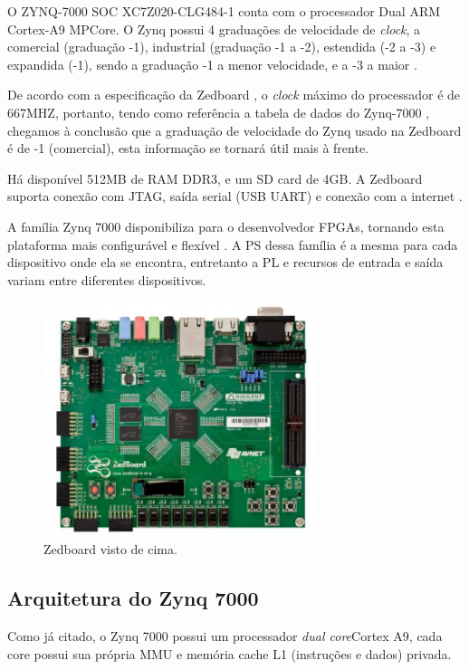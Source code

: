 O ZYNQ-7000 SOC XC7Z020-CLG484-1 conta com o processador Dual ARM Cortex-A9 MPCore. O Zynq possui 4 graduações de velocidade de \emph{clock}, a comercial (graduação -1), industrial (graduação -1 a -2), estendida (-2 a -3) e expandida (-1), sendo a graduação -1 a menor velocidade, e a -3 a maior \cite{product_table}.

De acordo com a especificação da Zedboard \cite{zedboard}, o \emph{clock} máximo do processador é de 667MHZ, portanto, tendo como referência a tabela de dados do Zynq-7000 \cite[p.~13]{data_sheet}, chegamos à conclusão que a graduação de velocidade do Zynq usado na Zedboard é de -1 (comercial), esta informação se tornará útil mais à frente.

Há disponível 512MB de RAM DDR3, e um SD card de 4GB. A Zedboard suporta conexão com JTAG, saída serial (USB UART) e conexão com a internet \cite{xilinx}.

A família Zynq 7000 disponibiliza para o desenvolvedor FPGAs, tornando esta plataforma mais configurável e flexível \cite[p.~26]{ug585}. A PS dessa família é a mesma para cada dispositivo onde ela se encontra, entretanto a PL e recursos de entrada e saída variam entre diferentes dispositivos. 


\begin{figure}[ht!]
    \centering
    \includegraphics[width=8cm]{figuras/zedboard}
    \caption{Zedboard visto de cima.}
\end{figure}

\subsection{Arquitetura do Zynq 7000}
Como já citado, o Zynq 7000 possui um processador \emph{dual core}Cortex A9, cada core possui sua própria MMU e memória cache L1 (instruções e dados) privada.

